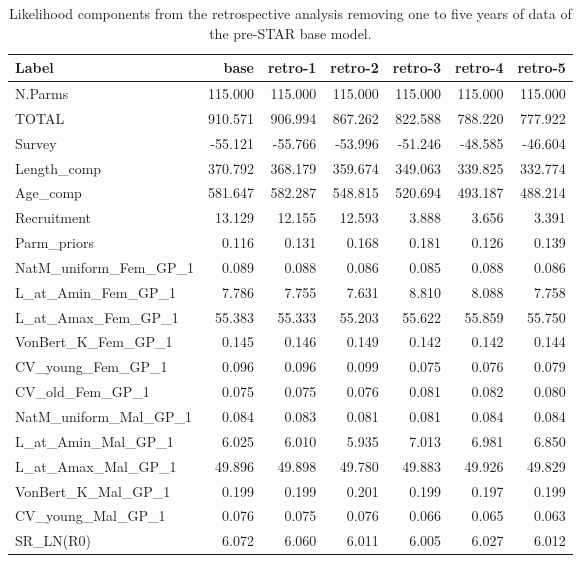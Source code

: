 \documentclass[11pt,
  english,
]{article}
\begin{document}
\begin{landscape}\begin{table}

\caption{\label{tab:retro}Likelihood components from the retrospective analysis removing one to five years of data of the pre-STAR base model.}
\centering
\begin{tabular}[t]{lrrrrrr}
\toprule
Label & base & retro-1 & retro-2 & retro-3 & retro-4 & retro-5\\
\midrule
N.Parms & 115.000 & 115.000 & 115.000 & 115.000 & 115.000 & 115.000\\
TOTAL & 910.571 & 906.994 & 867.262 & 822.588 & 788.220 & 777.922\\
Survey & -55.121 & -55.766 & -53.996 & -51.246 & -48.585 & -46.604\\
Length\_comp & 370.792 & 368.179 & 359.674 & 349.063 & 339.825 & 332.774\\
Age\_comp & 581.647 & 582.287 & 548.815 & 520.694 & 493.187 & 488.214\\
Recruitment & 13.129 & 12.155 & 12.593 & 3.888 & 3.656 & 3.391\\
Parm\_priors & 0.116 & 0.131 & 0.168 & 0.181 & 0.126 & 0.139\\
NatM\_uniform\_Fem\_GP\_1 & 0.089 & 0.088 & 0.086 & 0.085 & 0.088 & 0.086\\
L\_at\_Amin\_Fem\_GP\_1 & 7.786 & 7.755 & 7.631 & 8.810 & 8.088 & 7.758\\
L\_at\_Amax\_Fem\_GP\_1 & 55.383 & 55.333 & 55.203 & 55.622 & 55.859 & 55.750\\
VonBert\_K\_Fem\_GP\_1 & 0.145 & 0.146 & 0.149 & 0.142 & 0.142 & 0.144\\
CV\_young\_Fem\_GP\_1 & 0.096 & 0.096 & 0.099 & 0.075 & 0.076 & 0.079\\
CV\_old\_Fem\_GP\_1 & 0.075 & 0.075 & 0.076 & 0.081 & 0.082 & 0.080\\
NatM\_uniform\_Mal\_GP\_1 & 0.084 & 0.083 & 0.081 & 0.081 & 0.084 & 0.084\\
L\_at\_Amin\_Mal\_GP\_1 & 6.025 & 6.010 & 5.935 & 7.013 & 6.981 & 6.850\\
L\_at\_Amax\_Mal\_GP\_1 & 49.896 & 49.898 & 49.780 & 49.883 & 49.926 & 49.829\\
VonBert\_K\_Mal\_GP\_1 & 0.199 & 0.199 & 0.201 & 0.199 & 0.197 & 0.199\\
CV\_young\_Mal\_GP\_1 & 0.076 & 0.075 & 0.076 & 0.066 & 0.065 & 0.063\\
SR\_LN(R0) & 6.072 & 6.060 & 6.011 & 6.005 & 6.027 & 6.012\\

\end{tabular}
\end{table}
\end{landscape}
\end{document}
